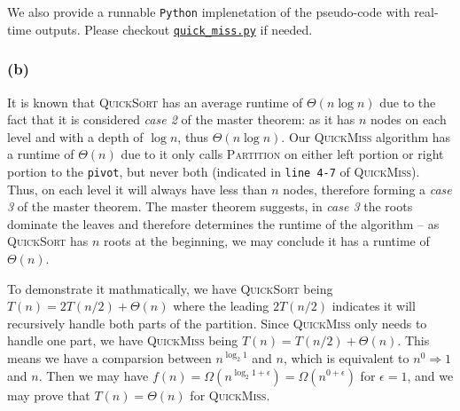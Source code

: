 \documentclass[11pt]{article}
\newcommand{\ilc}{\texttt}
\begin{document}
We also provide a runnable \ilc{Python} implenetation of the pseudo-code with real-time outputs. Please checkout
\href{https://gist.github.com/choH/aa6ef8d549216ca1aa47a2aedab8dfa8}{\ilc{quick\_miss.py}} if needed.

\subsubsection{(b)}

It is known that \textsc{QuickSort} has an average runtime of $\Theta(n\log n)$ due to the fact that it is considered \textit{case 2} of the master theorem: as it has $n$ nodes on each level and with a depth of $\log n$, thus $\Theta(n\log n)$. Our \textsc{QuickMiss} algorithm has a runtime of $\Theta(n)$ due to it only calls \textsc{Partition} on either left portion or right portion to the \ilc{pivot}, but never both (indicated in \ilc{line 4-7} of \textsc{QuickMiss}). Thus, on each level it will always have less than $n$ nodes, therefore forming a \textit{case 3} of the master theorem. The master theorem suggests, in \textit{case 3} the roots dominate the leaves and therefore determines the runtime of the algorithm -- as \textsc{QuickSort} has $n$ roots at the beginning, we may conclude it has a runtime of $\Theta(n)$.\newline

To demonstrate it mathmatically, we have \textsc{QuickSort} being $T(n) = 2T(n/2) + \Theta(n)$ where  the leading $2T(n/2)$ indicates it will recursively handle both parts of the partition. Since \textsc{QuickMiss} only needs to handle one part, we have \textsc{QuickMiss} being $T(n) = T(n/2) + \Theta(n)$. This means we have a comparsion between $n^{\log_2 1}$ and $n$, which is equivalent to $n^0 \Rightarrow 1$ and $n$. Then we may have $f(n) = \Omega(n^{\log_2 1 + \epsilon}) = \Omega(n^{0 + \epsilon})$ for $\epsilon = 1$, and we may prove that $T(n) = \Theta(n)$ for \textsc{QuickMiss}.


%
% 
% 
\end{document}
